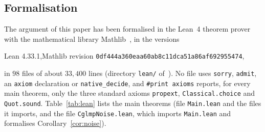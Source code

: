 \documentclass[11pt]{amsart}
\theoremstyle{definition}
\theoremstyle{remark}
\numberwithin{equation}{section}
\begin{document}
\subsection{Formalisation}\label{subsec:formal}
The argument of this paper has been formalised in the Lean~4 theorem prover~\cite{Lean} with the mathematical library
Mathlib~\cite{Mathlib}, in the versions
\begin{center}
\small Lean 4.33.1,\qquad Mathlib revision \texttt{0df444a360eaa60ab8c11dca51a86af692955474},
\end{center}
in $98$ files of about $33{,}400$ lines (directory \texttt{lean/} of~\cite{repo-oqp27}). No file uses \texttt{sorry},
\texttt{admit}, an \texttt{axiom} declaration or \texttt{native\_decide}, and \texttt{\#print axioms} reports, for every
main theorem, only the three standard axioms \texttt{propext}, \texttt{Classical.choice} and \texttt{Quot.sound}.
Table~\ref{tab:lean} lists the main theorems (file \texttt{Main.lean} and the files it imports, and the file
\texttt{CglmpNoise.lean}, which imports \texttt{Main.lean} and formalises Corollary~\ref{cor:noise}).
\end{document}

